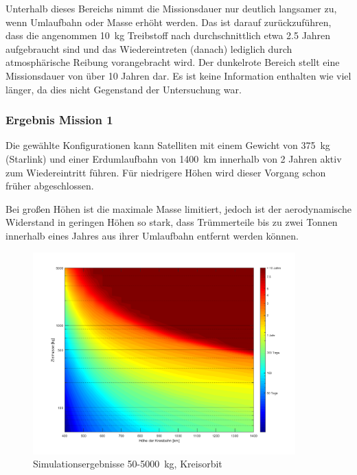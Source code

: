  Unterhalb dieses Bereichs nimmt die Missionsdauer nur deutlich langsamer zu, wenn Umlaufbahn oder Masse erhöht werden. Das ist darauf zurückzuführen, dass die angenommen \SI{10}{\kg} Treibstoff nach durchschnittlich etwa \num{2.5} Jahren aufgebraucht sind und das Wiedereintreten (danach) lediglich durch atmosphärische Reibung vorangebracht wird. Der dunkelrote Bereich stellt eine Missionsdauer von über \num{10} Jahren dar. Es ist keine Information enthalten wie viel länger, da dies nicht Gegenstand der Untersuchung war.

\subsubsection{Ergebnis Mission 1}
	

Die gewählte Konfigurationen kann Satelliten mit einem Gewicht von \SI{375}{\kilogram} (Starlink) und einer Erdumlaufbahn von \SI{1400}{\kilo\metre} innerhalb von \num{2} Jahren aktiv zum Wiedereintritt führen. Für niedrigere Höhen wird dieser Vorgang schon früher abgeschlossen. 

	Bei großen Höhen ist die maximale Masse limitiert, jedoch ist der aerodynamische Widerstand in geringen Höhen so stark, dass Trümmerteile bis zu zwei Tonnen innerhalb eines Jahres aus ihrer Umlaufbahn entfernt werden können. 


\begin{figure}[t]
\centering
\includegraphics[width=0.90\textwidth]{./graphics/GMAT/GMAT_Mass_over_Height.png}
\caption{Simulationsergebnisse \num{50}-\SI{5000}{\kilogram}, Kreisorbit}
\label{fig:GMAT_Mass_over_Height}
\end{figure}

